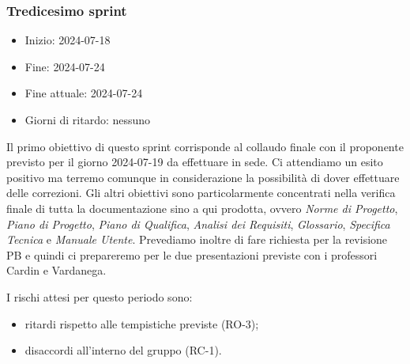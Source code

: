 \newpage
\subsubsection{Tredicesimo sprint}
\begin{itemize}
    \item Inizio: 2024-07-18
    \item Fine: 2024-07-24
    \item Fine attuale: 2024-07-24
    \item Giorni di ritardo: nessuno
\end{itemize}

Il primo obiettivo di questo sprint corrisponde al collaudo finale con il proponente previsto per il giorno 2024-07-19 da effettuare in sede. Ci attendiamo un esito positivo ma terremo comunque in considerazione la possibilità di dover effettuare delle correzioni. Gli altri obiettivi sono particolarmente concentrati nella verifica finale di tutta la documentazione sino a qui prodotta, ovvero \textit{Norme di Progetto}, \textit{Piano di Progetto}, \textit{Piano di Qualifica}, \textit{Analisi dei Requisiti}, \textit{Glossario}, \textit{Specifica Tecnica} e \textit{Manuale Utente}. Prevediamo inoltre di fare richiesta per la revisione PB e quindi ci prepareremo per le due presentazioni previste con i professori Cardin e Vardanega.

I rischi attesi per questo periodo sono:
\begin{itemize}
	\item ritardi rispetto alle tempistiche previste (RO-3);
    \item disaccordi all'interno del gruppo (RC-1).
\end{itemize}

